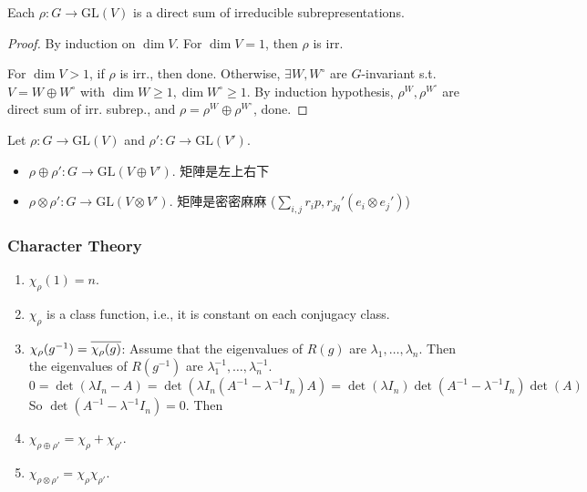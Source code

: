 \begin{theorem}
  Each $\rho: G\to \text{GL}(V)$ is a direct sum of irreducible
  subrepresentations.
  \begin{proof}
    By induction on $\dim V$. For $\dim V = 1$, then $\rho$ is irr.

    For $\dim V > 1$, if $\rho$ is irr., then done.
    Otherwise, $\exists W, W^\circ$ are $G$-invariant s.t.
    $V = W \oplus W^\circ$ with $\dim W \ge 1, \dim W^\circ \ge 1$.
    By induction hypothesis, $\rho^W, \rho^{W^\circ}$ are direct sum
    of irr. subrep., and $\rho = \rho^W \oplus \rho^{W^\circ}$, done.
  \end{proof}
\end{theorem}

\begin{remark}
  Let $\rho: G \to \text{GL}(V)$ and $\rho': G \to \text{GL}(V')$.
  \begin{itemize}
    \item $\rho \oplus \rho': G \to \text{GL}(V\oplus V')$.
      矩陣是左上右下
    \item $\rho \otimes \rho': G \to \text{GL}(V\otimes V')$.
      矩陣是密密麻麻 ($\sum_{i,j} r_ip, r_{jq}' (e_i \otimes e_j')$)
  \end{itemize}
\end{remark}

\subsubsection{Character Theory }

\begin{enumerate}
  \item $\chi_\rho(1) = n$.
  \item $\chi_\rho$ is a class function, i.e., it is constant on each
    conjugacy class.
  \item $\chi_\rho(g^{-1}) = \overline{\chi_\rho(g)}$: Assume that the eigenvalues
    of $R(g)$ are $\lambda_1, \dots, \lambda_n$. Then the eigenvalues of
    $R(g^{-1})$ are $\lambda_1^{-1}, \dots, \lambda_n^{-1}$.
    \[
      0 = \det(\lambda I_n - A) =
      \det(\lambda I_n (A^{-1} - \lambda^{-1}I_n) A) =
      \det(\lambda I_n) \det(A^{-1} - \lambda^{-1} I_n) \det(A)
    \]
    So $\det(A^{-1} - \lambda^{-1} I_n) = 0$.
    Then
  \item $\chi_{\rho \oplus \rho'} = \chi_{\rho} + \chi_{\rho'}$.
  \item $\chi_{\rho \otimes \rho'} = \chi_{\rho} \chi_{\rho'}$.
\end{enumerate}


